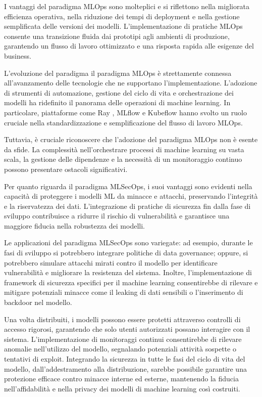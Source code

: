 I vantaggi del paradigma MLOps sono molteplici e si riflettono nella migliorata efficienza operativa, nella riduzione dei tempi di deployment e nella gestione semplificata delle versioni dei modelli. L'implementazione di pratiche MLOps consente una transizione fluida dai prototipi agli ambienti di produzione, garantendo un flusso di lavoro ottimizzato e una risposta rapida alle esigenze del business.

L'evoluzione del paradigma il paradigma MLOps è strettamente connessa all'avanzamento delle tecnologie che ne supportano l'implementazione. L'adozione di strumenti di automazione, gestione del ciclo di vita e orchestrazione dei modelli ha ridefinito il panorama delle operazioni di machine learning. In particolare, piattaforme come Ray \cite{ray}, MLflow \cite{mlflow} e Kubeflow \cite{kubeflow} hanno svolto un ruolo cruciale nella standardizzazione e semplificazione del flusso di lavoro MLOps.

Tuttavia, è cruciale riconoscere che l'adozione del paradigma MLOps non è esente da sfide. La complessità nell'orchestrare processi di machine learning su vasta scala, la gestione delle dipendenze e la necessità di un monitoraggio continuo possono presentare ostacoli significativi.

Per quanto riguarda il paradigma MLSecOps, i suoi vantaggi sono evidenti nella capacità di proteggere i modelli ML da minacce e attacchi, preservando l'integrità e la riservatezza dei dati. L'integrazione di pratiche di sicurezza fin dalla fase di sviluppo contribuisce a ridurre il rischio di vulnerabilità e garantisce una maggiore fiducia nella robustezza dei modelli.

Le applicazioni del paradigma MLSecOps sono variegate: ad esempio, durante le fasi di sviluppo si potrebbero integrare politiche di data governance; oppure, si potrebbero simulare attacchi mirati contro il modello per identificare vulnerabilità e migliorare la resistenza del sistema. Inoltre, l'implementazione di framework di sicurezza specifici per il machine learning consentirebbe di rilevare e mitigare potenziali minacce come il leaking di dati sensibili o l'inserimento di backdoor nel modello.

Una volta distribuiti, i modelli possono essere protetti attraverso controlli di accesso rigorosi, garantendo che solo utenti autorizzati possano interagire con il sistema. L'implementazione di monitoraggi continui consentirebbe di rilevare anomalie nell'utilizzo del modello, segnalando potenziali attività sospette o tentativi di exploit. Integrando la sicurezza in tutte le fasi del ciclo di vita del modello, dall'addestramento alla distribuzione, sarebbe possibile garantire una protezione efficace contro minacce interne ed esterne, mantenendo la fiducia nell'affidabilità e nella privacy dei modelli di machine learning così costruiti.

